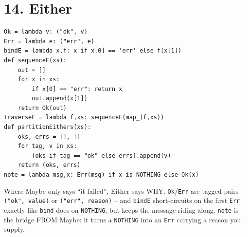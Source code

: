 \documentclass[10pt,letterpaper]{book}
\begin{document}
\section*{14. Either}
\begin{lstlisting}[style=code]
Ok = lambda v: ("ok", v)
Err = lambda e: ("err", e)
bindE = lambda x,f: x if x[0] == 'err' else f(x[1])
def sequenceE(xs):
    out = []
    for x in xs:
        if x[0] == "err": return x
        out.append(x[1])
    return Ok(out)
traverseE = lambda f,xs: sequenceE(map_(f,xs))
def partitionEithers(xs):
    oks, errs = [], []
    for tag, v in xs:
        (oks if tag == "ok" else errs).append(v)
    return (oks, errs)
note = lambda msg,x: Err(msg) if x is NOTHING else Ok(x)
\end{lstlisting}

Where Maybe only says ``it failed'', Either says WHY. \texttt{Ok}/\texttt{Err} are tagged pairs --
\texttt{("ok", value)} or \texttt{("err", reason)} -- and \texttt{bindE} short-circuits on the first
\texttt{Err} exactly like \texttt{bind} does on \texttt{NOTHING}, but keeps the message riding along.
\texttt{note} is the bridge FROM Maybe: it turns a \texttt{NOTHING} into an \texttt{Err} carrying a
reason you supply.
\end{document}
